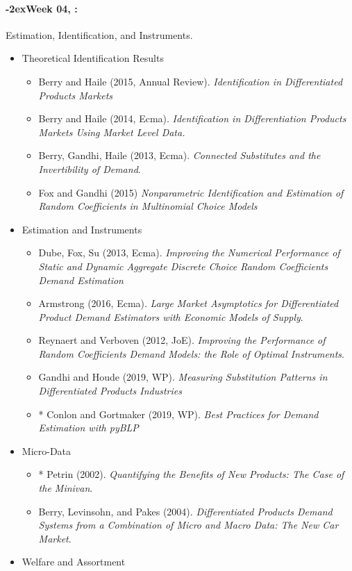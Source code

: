 \documentclass[11pt]{article}
\newcommand{\week}[1]{%
  \paragraph*{\kern-2ex\quad #1, \syldate{\today}:}%
  \ifdim\wd1=\wd\THURSDAY
    \AdvanceDate[7]
  \else
    \AdvanceDate[7]
  \fi%
}
\begin{document}
\week{Week 04} Estimation, Identification, and Instruments.
\begin{itemize}
\item Theoretical Identification Results
\begin{itemize}
\item Berry and Haile (2015, Annual Review). \textit{Identification in Differentiated Products Markets}
\item Berry and Haile (2014, Ecma). \textit{Identification in Differentiation Products Markets Using Market Level Data.}
\item Berry, Gandhi, Haile (2013, Ecma). \textit{Connected Substitutes and the Invertibility of Demand}.
\item Fox and Gandhi (2015) \textit{Nonparametric Identification and Estimation of Random Coefficients in Multinomial Choice Models}
\end{itemize}
\item Estimation and Instruments
\begin{itemize}
\item Dube, Fox, Su (2013, Ecma). \textit{Improving the Numerical Performance of Static and Dynamic Aggregate Discrete Choice Random Coefficients Demand Estimation}
\item Armstrong (2016, Ecma). \textit{Large Market Asymptotics for Differentiated Product Demand Estimators with Economic Models of Supply}.
\item Reynaert and Verboven (2012, JoE). \textit{Improving the Performance of Random Coefficients Demand Models: the Role of Optimal Instruments}.
\item Gandhi and Houde (2019, WP). \textit{Measuring Substitution Patterns in Differentiated Products Industries}
\item * Conlon and Gortmaker (2019, WP). \textit{Best Practices for Demand Estimation with pyBLP}
\end{itemize}
\item Micro-Data
\begin{itemize}
\item * Petrin (2002). \textit{Quantifying the Benefits of New Products: The Case of the Minivan}.
\item Berry, Levinsohn, and Pakes (2004). \textit{Differentiated Products Demand Systems from a Combination of Micro and Macro Data: The New Car Market}.
\end{itemize}
\item Welfare and Assortment
\begin{itemize}

\end{itemize}
\end{itemize}
\end{document}
